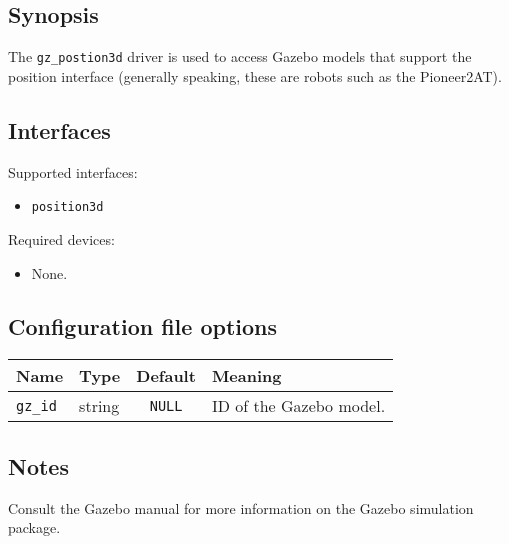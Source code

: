 \subsection*{Synopsis}

The {\tt gz\_postion3d} driver is used to access Gazebo models that
support the position interface (generally speaking, these are robots
such as the Pioneer2AT).  

\subsection*{Interfaces}

\noindent Supported interfaces:
\begin{itemize}
\item {\tt position3d}
\end{itemize}

\noindent Required devices:
\begin{itemize}
\item None.
\end{itemize}



\subsection*{Configuration file options}

\begin{center}
{\small \begin{tabularx}{\columnwidth}{|l|l|c|X|}
\hline
Name & Type & Default & Meaning\\
\hline
{\tt gz\_id} & string & {\tt NULL} & ID of the Gazebo model. \\
\hline
\end{tabularx}}
\end{center}

\subsection*{Notes}

Consult the Gazebo manual for more information on the Gazebo
simulation package.


